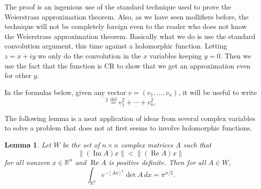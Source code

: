 \documentclass[12pt,openany]{book}
\renewcommand{\Re}{\operatorname{Re}}
\renewcommand{\Im}{\operatorname{Im}}
\newcommand{\snorm}[1]{\lVert {#1} \rVert}
\newcommand{\R}{{\mathbb{R}}}
\theoremstyle{plain}
\newtheorem{lemma}[thm]{Lemma}
\theoremstyle{remark}
\theoremstyle{definition}
\theoremstyle{exercise}
\theoremstyle{example}
\begin{document}
The proof is an ingenious 
use of the standard technique used to prove the Weierstrass approximation
theorem.  Also, as we have seen mollifiers before, the technique will not be
completely foreign even to the reader who does not know the Weierstrass
approximation theorem.  Basically what we do is use the standard convolution
argument, this time against a holomorphic function.  Letting $z=x+iy$
we only do the convolution in the
$x$ variables keeping $y=0$.  Then we use the fact that the
function is CR to show that we get an approximation even for other $y$.

In the formulas below, given any vector $v = (v_1,\ldots,v_n)$,
it will be useful to write
\begin{equation*}
[v]^2 \overset{\text{def}}{=} v_1^2 + \cdots + v_n^2 .
\end{equation*}

The following lemma is a neat application of ideas from several complex
variables to solve a problem that does not at first seems to involve
holomorphic functions.

\begin{lemma} \label{lemma:matrixint}
Let $W$ be the set of $n \times n$ complex matrices $A$ such that
\begin{equation*}
\snorm{(\Im A)x} < \snorm{(\Re A)x}
\end{equation*}
for all nonzero $x \in \R^n$ and $\Re A$ is positive definite.
Then for all $A \in W$,
\begin{equation*}
\int_{\R^n} e^{-{[Ax]}^2} \det A \, dx  = \pi^{n/2} .
\end{equation*}
\end{lemma}
\end{document}
